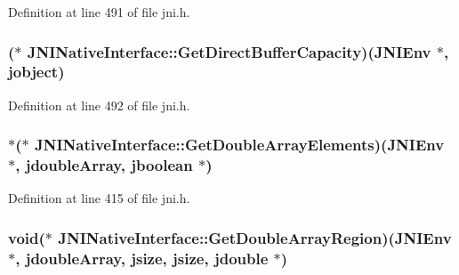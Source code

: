 Definition at line 491 of file jni.\-h.

\hypertarget{struct_j_n_i_native_interface_a9cbfc2041d5408cc432a7acc5a7a71c2}{
\subsubsection[{Get\-Direct\-Buffer\-Capacity}]{($\ast$ J\-N\-I\-Native\-Interface\-::\-Get\-Direct\-Buffer\-Capacity)({\bf J\-N\-I\-Env} $\ast$, {\bf jobject})}}\label{struct_j_n_i_native_interface_a9cbfc2041d5408cc432a7acc5a7a71c2}


Definition at line 492 of file jni.\-h.

\hypertarget{struct_j_n_i_native_interface_aea213344d6703d770d0d9281a4e1756a}{
\subsubsection[{Get\-Double\-Array\-Elements}]{$\ast$($\ast$ J\-N\-I\-Native\-Interface\-::\-Get\-Double\-Array\-Elements)({\bf J\-N\-I\-Env} $\ast$, {\bf jdouble\-Array}, {\bf jboolean} $\ast$)}}\label{struct_j_n_i_native_interface_aea213344d6703d770d0d9281a4e1756a}


Definition at line 415 of file jni.\-h.

\hypertarget{struct_j_n_i_native_interface_a03b7b4770390b8eefcc08bafe0a8b2aa}{
\subsubsection[{Get\-Double\-Array\-Region}]{\setlength{\rightskip}{0pt plus 5cm}void($\ast$ J\-N\-I\-Native\-Interface\-::\-Get\-Double\-Array\-Region)({\bf J\-N\-I\-Env} $\ast$, {\bf jdouble\-Array}, {\bf jsize}, {\bf jsize}, {\bf jdouble} $\ast$)}}\label{struct_j_n_i_native_interface_a03b7b4770390b8eefcc08bafe0a8b2aa}


